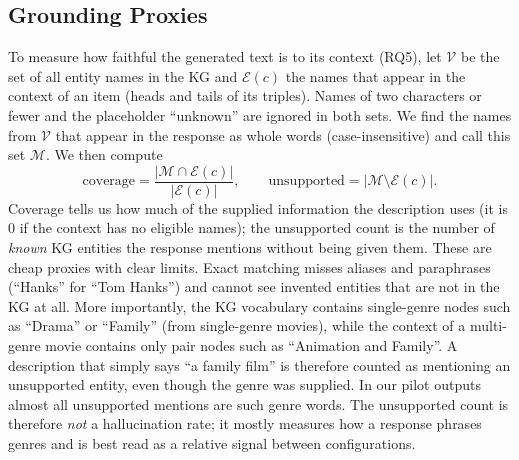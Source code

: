 \documentclass[a4paper,11pt]{article}
\begin{document}
\subsection{Grounding Proxies}
\label{sec:grounding-metrics}
To measure how faithful the generated text is to its context (RQ5), let $\mathcal{V}$ be the set of all entity names in the KG and $\mathcal{E}(c)$ the names that appear in the context of an item (heads and tails of its triples). Names of two characters or fewer and the placeholder ``unknown'' are ignored in both sets. We find the names from $\mathcal{V}$ that appear in the response as whole words (case-insensitive) and call this set $\mathcal{M}$. We then compute
\begin{equation}
\text{coverage} = \frac{|\mathcal{M}\cap\mathcal{E}(c)|}{|\mathcal{E}(c)|}, \qquad
\text{unsupported} = |\mathcal{M}\setminus\mathcal{E}(c)|.
\end{equation}
Coverage tells us how much of the supplied information the description uses (it is $0$ if the context has no eligible names); the unsupported count is the number of \emph{known} KG entities the response mentions without being given them. These are cheap proxies with clear limits. Exact matching misses aliases and paraphrases (``Hanks'' for ``Tom Hanks'') and cannot see invented entities that are not in the KG at all. More importantly, the KG vocabulary contains single-genre nodes such as ``Drama'' or ``Family'' (from single-genre movies), while the context of a multi-genre movie contains only pair nodes such as ``Animation and Family''. A description that simply says ``a family film'' is therefore counted as mentioning an unsupported entity, even though the genre was supplied. In our pilot outputs almost all unsupported mentions are such genre words. The unsupported count is therefore \emph{not} a hallucination rate; it mostly measures how a response phrases genres and is best read as a relative signal between configurations.
\end{document}
